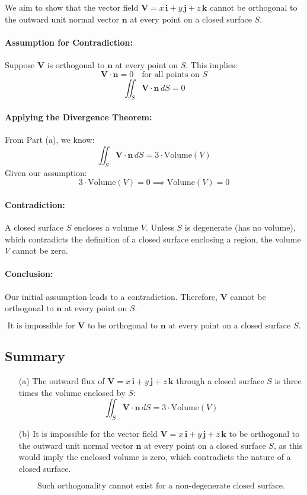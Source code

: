\documentclass[11pt]{article}
\begin{document}
We aim to show that the vector field \( \mathbf{V} = x\,\mathbf{i} + y\,\mathbf{j} + z\,\mathbf{k} \) cannot be orthogonal to the outward unit normal vector \( \mathbf{n} \) at every point on a closed surface \( S \).

\paragraph{Assumption for Contradiction:}
Suppose \( \mathbf{V} \) is orthogonal to \( \mathbf{n} \) at every point on \( S \). This implies:
\[
\mathbf{V} \cdot \mathbf{n} = 0 \quad \text{for all points on } S
\]
\[
\iint_{S} \mathbf{V} \cdot \mathbf{n} \, dS = 0
\]

\paragraph{Applying the Divergence Theorem:}
From Part (a), we know:
\[
\iint_{S} \mathbf{V} \cdot \mathbf{n} \, dS = 3 \cdot \text{Volume}(V)
\]
Given our assumption:
\[
3 \cdot \text{Volume}(V) = 0 \implies \text{Volume}(V) = 0
\]
\paragraph{Contradiction:}
A closed surface \( S \) encloses a volume \( V \). Unless \( S \) is degenerate (has no volume), which contradicts the definition of a closed surface enclosing a region, the volume \( V \) cannot be zero.

\paragraph{Conclusion:}
Our initial assumption leads to a contradiction. Therefore, \( \mathbf{V} \) cannot be orthogonal to \( \mathbf{n} \) at every point on \( S \).

\[
\boxed{ \text{It is impossible for } \mathbf{V} \text{ to be orthogonal to } \mathbf{n} \text{ at every point on a closed surface } S. }
\]

\newpage

\subsection{Summary}

\begin{enumerate}
    \item[(a)] The outward flux of \( \mathbf{V} = x\,\mathbf{i} + y\,\mathbf{j} + z\,\mathbf{k} \) through a closed surface \( S \) is three times the volume enclosed by \( S \):
    \[
    \boxed{ \iint_{S} \mathbf{V} \cdot \mathbf{n} \, dS = 3 \cdot \text{Volume}(V) }
    \]

    \item[(b)] It is impossible for the vector field \( \mathbf{V} = x\,\mathbf{i} + y\,\mathbf{j} + z\,\mathbf{k} \) to be orthogonal to the outward unit normal vector \( \mathbf{n} \) at every point on a closed surface \( S \), as this would imply the enclosed volume is zero, which contradicts the nature of a closed surface.

    \[
    \boxed{ \text{Such orthogonality cannot exist for a non-degenerate closed surface.} }
    \]
\end{enumerate}
\end{document}
